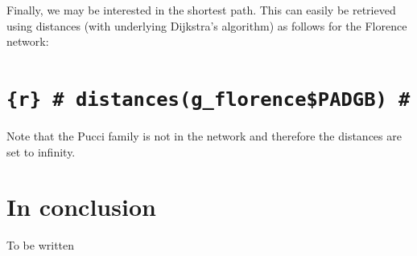 \documentclass[]{article}
\theoremstyle{definition}
\theoremstyle{definition}
\theoremstyle{definition}
\theoremstyle{remark}
\begin{document}
Finally, we may be interested in the shortest path. This can easily be
retrieved using distances (with underlying Dijkstra's algorithm) as
follows for the Florence network:

\section{\texorpdfstring{\texttt{\{r\}\ \#\ distances(g\_florence\$PADGB)\ \#}}{\{r\} \# distances(g\_florence\$PADGB) \#}}\label{r-distancesg_florencepadgb}

Note that the Pucci family is not in the network and therefore the
distances are set to infinity.

\section{In conclusion}\label{in-conclusion}

To be written
\end{document}
